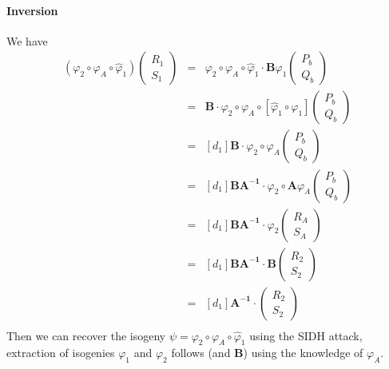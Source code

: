 \documentclass[11pt]{article}
\begin{document}
		\paragraph{Inversion} We have
		\begin{eqnarray*}
			(\varphi_2\circ\varphi_A\circ\widehat\varphi_1)\begin{pmatrix}R_1\\S_1\end{pmatrix} 
		&=&\varphi_2\circ\varphi_A\circ\widehat\varphi_1\cdot\mathbf B\varphi_1
		\begin{pmatrix} P_b \\ Q_b \end{pmatrix}  \\
		&=& \mathbf B \cdot\varphi_2\circ\varphi_A\circ[\widehat\varphi_1\circ\varphi_1]
		\begin{pmatrix} P_b \\ Q_b \end{pmatrix} \\
		&=&[d_1] \mathbf B\cdot\varphi_2\circ\varphi_A\begin{pmatrix} P_b \\ Q_b \end{pmatrix} \\
		&=&[d_1] \mathbf{BA^{-1}}\cdot\varphi_2\circ\mathbf A\varphi_A
		\begin{pmatrix} P_b \\ Q_b \end{pmatrix} \\
		&=&[d_1] \mathbf{BA^{-1}}\cdot\varphi_2
		\begin{pmatrix} R_A \\ S_A \end{pmatrix} \\
		&=&[d_1] \mathbf{BA^{-1}}\cdot\mathbf{B}
		\begin{pmatrix} R_2 \\ S_2 \end{pmatrix} \\
		&=&[d_1] \mathbf{A^{-1}}\cdot\begin{pmatrix} R_2 \\ S_2 \end{pmatrix} \\
	\end{eqnarray*}
	Then we can recover the isogeny $\psi=\varphi_2\circ\varphi_A\circ\widehat\varphi_1$
	using the SIDH attack, extraction of isogenies  $\varphi_1$ and $\varphi_2$ follows
	(and $\mathbf B$) using the knowledge of $\varphi_A$.
\end{document}
